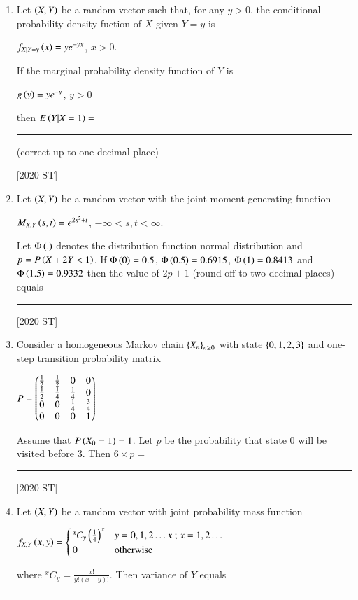 \documentclass[journal]{IEEEtran}
\begin{document}
\begin{enumerate}
    \item Let $\left(X,Y\right)$ be a random vector such that, for any $ y > 0$, the conditional probability density fuction of $X$ given $Y = y$ is 
    \begin{center}
        $f_{X|Y=y}\left(x\right) = ye^{-yx}$, $x > 0.$
    \end{center}
    If the marginal probability density function of $Y$ is 
    \begin{center}
        $g\left(y\right) = ye^{-y}$, $y > 0$
    \end{center}
    then $E\left(Y|X=1\right) = $ \rule{2cm}{0.4pt} (correct up to one decimal place)

    \hfill [2020 ST]
    \item Let $\left(X,Y\right)$ be a random vector with the joint moment generating function 
    \begin{center}
        $M_{X,Y}\left(s,t\right) = e^{2s^2 + t}$, $-\infty < s,t < \infty$.
    \end{center}
    Let $\Phi\left(.\right)$ denotes the distribution function normal distribution and $p = P\left(X + 2Y < 1\right)$. If $\Phi \left(0\right) = 0.5$, $\Phi\left(0.5\right) = 0.6915$, $\Phi\left(1\right) = 0.8413$ and $\Phi \left(1.5\right) = 0.9332$ then the value of $2p + 1$ (round off to two decimal places) equals \rule{2cm}{0.4pt}

    \hfill [2020 ST]
    \item Consider a homogeneous Markov chain $\left\{X_n\right\}_{n \geq 0}$ with state $\left\{0,1,2,3\right\}$ and one-step transition probability matrix 
    \begin{center}
        $P = \begin{pmatrix}\frac{1}{2} & \frac{1}{2} & 0 & 0 \\ \frac{1}{2} & \frac{1}{4} & \frac{1}{4} & 0 \\
        0 & 0 & \frac{1}{4} & \frac{3}{4} \\ 0 & 0 & 0 & 1\end{pmatrix}$
    \end{center}
    Assume that $P\left(X_0 = 1\right) = 1$. Let $p$ be the probability that state 0 will be visited before 3. Then $6 \times p = $ \rule{2cm}{0.4pt}

    \hfill [2020 ST]
    \item Let $\left(X,Y\right)$ be a random vector with joint probability mass function
    \begin{center}
        $f_{X,Y}\left(x,y\right) = 
        \begin{cases}
            ^xC_y\left(\frac{1}{4}\right)^x & y = 0,1,2 \ldots x\text{ ; } x = 1,2 \ldots \\
            0 & \text{otherwise}
        \end{cases}$
    \end{center}
    where $^xC_y = \frac{x!}{y!(x-y)!}$. Then variance of $Y$ equals \rule{2cm}{0.4pt}


\end{enumerate}
\end{document}

